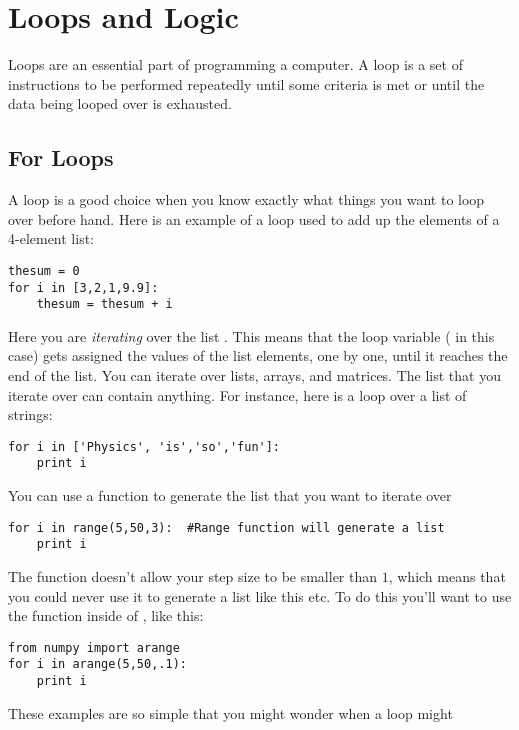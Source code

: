 \chapter{Loops and Logic}
\label{chap:LoopsLogic}

Loops are an essential part of programming a computer. A loop is a set
of instructions to be performed repeatedly until some criteria is met
or until the data being looped over is exhausted.

\section{For Loops}
A  loop is a good choice when you know exactly what things you want
to loop over before hand.  Here is an example of a  loop
used to add up the elements of a 4-element list:
\begin{Verbatim}
thesum = 0
for i in [3,2,1,9.9]:
    thesum = thesum + i
\end{Verbatim}
Here you are {\it iterating} over the list \code{[3,2,1,9.9]}.  This
means that the loop variable ( in this case) gets assigned
the values of the list elements, one by one, until it reaches the end
of the list.  You can iterate over lists, arrays, and
matrices.  The list
that you iterate over can contain anything.  For instance, here is a loop over a list of
strings:
\begin{Verbatim}
for i in ['Physics', 'is','so','fun']:
    print i
\end{Verbatim}
You can use a function to generate the list that you want to iterate
over
\begin{Verbatim}
for i in range(5,50,3):  #Range function will generate a list
    print i
\end{Verbatim}
The  function doesn't allow your step size to be smaller
than $1$, which means that you could never use it to generate a list
like this  etc.  To do this you'll want to use the
 function inside of , like this:
\begin{Verbatim}
from numpy import arange
for i in arange(5,50,.1):
    print i
\end{Verbatim}
These examples are so simple that you might wonder when a loop might
